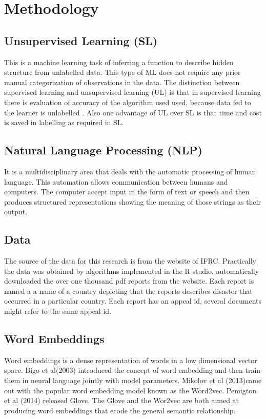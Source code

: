 \chapter{Methodology}
\section{Unsupervised Learning (SL)}
This is a machine learning task of inferring a function to describe hidden structure from unlabelled data. This type of ML does not require any prior manual categorization of observations in the data. The distinction between supervised learning and unsupervised learning (UL) is that in supervised learning there is evaluation of accuracy of the algorithm used used, because data fed to the learner is unlabelled . Also one advantage of UL over SL is that time and cost is saved in labelling as required in SL. 
\section{Natural Language Processing (NLP)}
It is a multidisciplinary area that deals with the automatic processing of human language. 
This automation allows communication between humans and computers. The computer accept input in the form of text or speech and then produces structured representations showing the meaning of those strings as their output.
\section{Data}
The source of the data for this research is from the website of IFRC. Practically the data was obtained by algorithms implemented in the R studio, automatically downloaded the over one thousand pdf reports from the website. Each report is named a a name of a country depicting that the reports describes disaster that occurred in a particular country. Each report has an appeal id, several documents might refer to the same appeal id.
\section{Word Embeddings}
Word embeddings is a dense representation of words in a low dimensional vector space. Bigo et al(2003) introduced the  concept of word embedding and then train them in neural language jointly with model parameters. Mikolov et al (2013)came out with the popular word embedding model known as the Word2vec. 
Pemigton et al (2014) released Glove. The Glove and the Wor2vec are both aimed at producing word embeddings that ecode the general semantic relationship.
